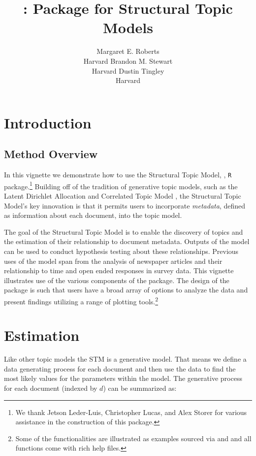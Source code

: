 \documentclass[nojss]{jss}
\author{\hspace{1.1in}Margaret E. Roberts\\\hspace{1.1in}Harvard \And
  \hspace{1.5in}Brandon M. Stewart\\\hspace{1.5in}Harvard \And
  \hspace{1.5in}Dustin Tingley\\\hspace{1.5in}Harvard \And
}
\title{\pkg{stm}: \proglang{R} Package for Structural Topic Models}
\newcommand\spacingset[1]{\renewcommand{\baselinestretch}{#1}\small\normalsize}
\begin{document}

\spacingset{1.5}

\section{Introduction}
\subsection{Method Overview}

In this vignette we demonstrate how to use the Structural Topic Model, , \texttt{R} package.\footnote{We thank Jetson Leder-Luis, Christopher Lucas, and Alex Storer for various assistance in the construction of this package.} Building off of the tradition of generative topic models, such as the Latent Dirichlet Allocation \citep{blei2003latent} and Correlated Topic Model \citep{blei2007correlated}, the Structural Topic Model's key innovation is that it permits users to incorporate \emph{metadata}, defined as information about each document, into the topic model.

The goal of the Structural Topic Model is to enable the discovery of topics and the estimation of their relationship to document metadata. Outputs of the model can be used to conduct hypothesis testing about these relationships. Previous uses of the model span from the analysis of newspaper articles and their relationship to time and open ended responses in survey data. This vignette illustrates use of the various components of the package. The design of the package is such that users have a broad array of options to analyze the data and present findings utilizing a range of plotting tools.\footnote{Some of the functionalities are illustrated as examples sourced via  and  and all functions come with rich help files.}

\section{Estimation}
Like other topic models the STM is a generative model. That means we define a data generating process for each document and then use the data to find the most likely values for the parameters within the model.  The generative process for each document (indexed by $d$) can be summarized as:
\end{document}
